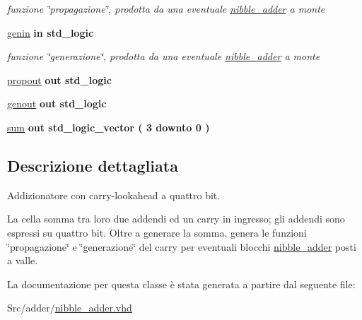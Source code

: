 \begin{DoxyCompactItemize}
\begin{DoxyCompactList}\small\item\em funzione \char`\"{}propagazione\char`\"{}, prodotta da una eventuale \hyperlink{classnibble__adder}{nibble\+\_\+adder} a monte \end{DoxyCompactList}\item 
\hyperlink{group___nibble_adder_ga0a46d5193cb73eb993bc5d4f69741d0a}{genin}  {\bfseries {\bfseries \textcolor{vhdlchar}{in}\textcolor{vhdlchar}{ }}} {\bfseries \textcolor{vhdlchar}{std\+\_\+logic}\textcolor{vhdlchar}{ }} 
\begin{DoxyCompactList}\small\item\em funzione \char`\"{}generazione\char`\"{}, prodotta da una eventuale \hyperlink{classnibble__adder}{nibble\+\_\+adder} a monte \end{DoxyCompactList}\item 
\hyperlink{group___nibble_adder_ga5957c9cdd706cafd2da8855133a002c9}{propout}  {\bfseries {\bfseries \textcolor{vhdlchar}{out}\textcolor{vhdlchar}{ }}} {\bfseries \textcolor{vhdlchar}{std\+\_\+logic}\textcolor{vhdlchar}{ }} 
\item 
\hyperlink{group___nibble_adder_ga068cd5c4d23e284cb942702252ed1491}{genout}  {\bfseries {\bfseries \textcolor{vhdlchar}{out}\textcolor{vhdlchar}{ }}} {\bfseries \textcolor{vhdlchar}{std\+\_\+logic}\textcolor{vhdlchar}{ }} 
\item 
\hyperlink{group___nibble_adder_gadfe538323c3296159dd3b383325a996b}{sum}  {\bfseries {\bfseries \textcolor{vhdlchar}{out}\textcolor{vhdlchar}{ }}} {\bfseries \textcolor{vhdlchar}{std\+\_\+logic\+\_\+vector}\textcolor{vhdlchar}{ }\textcolor{vhdlchar}{(}\textcolor{vhdlchar}{ }\textcolor{vhdlchar}{ } \textcolor{vhdldigit}{3} \textcolor{vhdlchar}{ }\textcolor{vhdlchar}{downto}\textcolor{vhdlchar}{ }\textcolor{vhdlchar}{ } \textcolor{vhdldigit}{0} \textcolor{vhdlchar}{ }\textcolor{vhdlchar}{)}\textcolor{vhdlchar}{ }} 
\end{DoxyCompactItemize}


\subsection{Descrizione dettagliata}
Addizionatore con carry-\/lookahead a quattro bit.

La cella somma tra loro due addendi ed un carry in ingresso; gli addendi sono espressi su quattro bit. Oltre a generare la somma, genera le funzioni \char`\"{}propagazione\char`\"{} e \char`\"{}generazione\char`\"{} del carry per eventuali blocchi \hyperlink{classnibble__adder}{nibble\+\_\+adder} posti a valle. 

La documentazione per questa classe è stata generata a partire dal seguente file\+:\begin{DoxyCompactItemize}
\item 
Src/adder/\hyperlink{nibble__adder_8vhd}{nibble\+\_\+adder.\+vhd}\end{DoxyCompactItemize}
